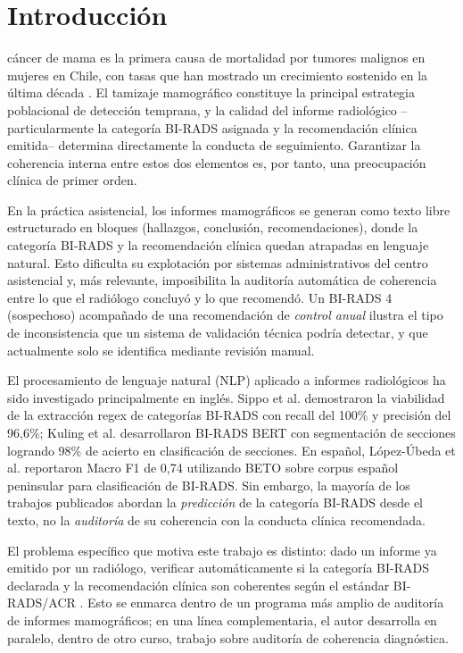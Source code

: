 \documentclass[10pt,journal,a4paper]{IEEEtran}
\begin{document}
\section{Introducci\'on}
 c\'ancer de mama es la primera causa de mortalidad por tumores malignos en mujeres en Chile, con tasas que han mostrado un crecimiento sostenido en la \'ultima d\'ecada \cite{deis2024}. El tamizaje mamogr\'afico constituye la principal estrategia poblacional de detecci\'on temprana, y la calidad del informe radiol\'ogico --particularmente la categor\'ia BI-RADS asignada y la recomendaci\'on cl\'inica emitida-- determina directamente la conducta de seguimiento. Garantizar la coherencia interna entre estos dos elementos es, por tanto, una preocupaci\'on cl\'inica de primer orden.

En la pr\'actica asistencial, los informes mamogr\'aficos se generan como texto libre estructurado en bloques (hallazgos, conclusi\'on, recomendaciones), donde la categor\'ia BI-RADS y la recomendaci\'on cl\'inica quedan atrapadas en lenguaje natural. Esto dificulta su explotaci\'on por sistemas administrativos del centro asistencial y, m\'as relevante, imposibilita la auditor\'ia autom\'atica de coherencia entre lo que el radi\'ologo concluy\'o y lo que recomend\'o. Un BI-RADS 4 (sospechoso) acompa\~nado de una recomendaci\'on de \emph{control anual} ilustra el tipo de inconsistencia que un sistema de validaci\'on t\'ecnica podr\'ia detectar, y que actualmente solo se identifica mediante revisi\'on manual.

El procesamiento de lenguaje natural (NLP) aplicado a informes radiol\'ogicos ha sido investigado principalmente en ingl\'es. Sippo et al. \cite{sippo2013} demostraron la viabilidad de la extracci\'on regex de categor\'ias BI-RADS con recall del 100\% y precisi\'on del 96,6\%; Kuling et al. \cite{kuling2022} desarrollaron BI-RADS BERT con segmentaci\'on de secciones logrando 98\% de acierto en clasificaci\'on de secciones. En espa\~nol, L\'opez-\'Ubeda et al. \cite{lopez2024} reportaron Macro F1 de 0,74 utilizando BETO sobre corpus espa\~nol peninsular para clasificaci\'on de BI-RADS. Sin embargo, la mayor\'ia de los trabajos publicados abordan la \emph{predicci\'on} de la categor\'ia BI-RADS desde el texto, no la \emph{auditor\'ia} de su coherencia con la conducta cl\'inica recomendada.

El problema espec\'ifico que motiva este trabajo es distinto: dado un informe ya emitido por un radi\'ologo, verificar autom\'aticamente si la categor\'ia BI-RADS declarada y la recomendaci\'on cl\'inica son coherentes seg\'un el est\'andar BI-RADS/ACR \cite{acr2013}. Esto se enmarca dentro de un programa m\'as amplio de auditor\'ia de informes mamogr\'aficos; en una l\'inea complementaria, el autor desarrolla en paralelo, dentro de otro curso, trabajo sobre auditor\'ia de coherencia diagn\'ostica.
\end{document}
